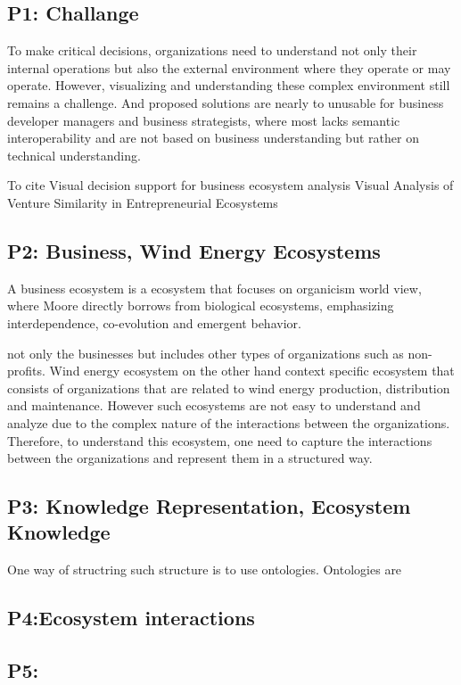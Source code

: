 \documentclass[runningheads]{llncs}
\begin{document}
\subsection{P1: Challange}
To make critical decisions, organizations need to understand not only their internal operations but also the external environment where 
they operate or may operate. However, visualizing and understanding these complex environment still remains a challenge. And proposed solutions
are nearly to unusable for business developer managers and business strategists, where most lacks semantic interoperability and are not 
based on business understanding but rather on technical understanding.

To cite
Visual decision support for business ecosystem analysis
Visual Analysis of Venture Similarity in Entrepreneurial Ecosystems

\subsection{P2: Business, Wind Energy Ecosystems}
A business ecosystem is a ecosystem that focuses on organicism world view, where Moore directly borrows from biological ecosystems, emphasizing
interdependence, co-evolution and emergent behavior.

not only the businesses but includes other types of organizations
such as non-profits. Wind energy ecosystem on the other hand context specific ecosystem that consists of
organizations that are related to wind energy production, distribution and maintenance. However such ecosystems 
are not easy to understand and analyze due to the complex nature of the interactions between the organizations. Therefore,
to understand this ecosystem, one need to capture the interactions between the organizations and represent them
in a structured way.

\subsection{P3: Knowledge Representation, Ecosystem Knowledge}
One way of structring such structure is to use ontologies. Ontologies are 

\subsection{P4:Ecosystem interactions}

\subsection{P5: }
\end{document}
